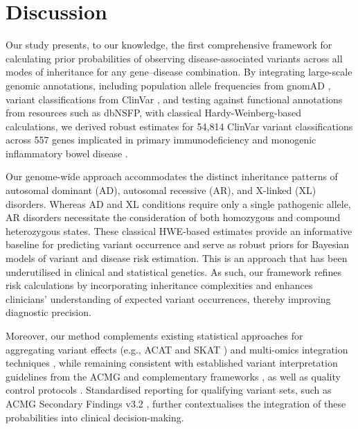 %
%
%

\section{Discussion}

Our study presents, to our knowledge, the first comprehensive framework for calculating prior probabilities of observing disease-associated variants across all modes of inheritance for any gene–disease combination. By integrating large-scale genomic annotations, including population allele frequencies from gnomAD \cite{karczewski2020mutational}, variant classifications from ClinVar \cite{landrum_clinvar_2018}, and testing against functional annotations from resources such as dbNSFP, with classical Hardy-Weinberg-based calculations, we derived robust estimates for 54,814 ClinVar variant classifications across 557 genes implicated in primary immunodeficiency and monogenic inflammatory bowel disease \cite{lawless_panelapprex_2025}. 

Our genome-wide approach accommodates the distinct inheritance patterns of autosomal dominant (AD), autosomal recessive (AR), and X-linked (XL) disorders. Whereas AD and XL conditions require only a single pathogenic allele, AR disorders necessitate the consideration of both homozygous and compound heterozygous states. These classical HWE-based estimates provide an informative baseline for predicting variant occurrence and serve as robust priors for Bayesian models of variant and disease risk estimation. This is an approach that has been underutilised in clinical and statistical genetics. As such, our framework refines risk calculations by incorporating inheritance complexities and enhances clinicians’ understanding of expected variant occurrences, thereby improving diagnostic precision.

Moreover, our method complements existing statistical approaches for aggregating variant effects (e.g., ACAT and SKAT \cite{liu2019acat,li2020dynamic,wu2011rare,lee2012optimal}) and multi-omics integration techniques \cite{kong2018nature,howe2021within}, while remaining consistent with established variant interpretation guidelines from the ACMG \cite{richards2015standards} and complementary frameworks \cite{tavtigian2020fitting,li2017intervar}, as well as quality control protocols \cite{pedersen2021effective,anderson2010data}. Standardised reporting for qualifying variant sets, such as ACMG Secondary Findings v3.2 \cite{miller2023acmg}, further contextualises the integration of these probabilities into clinical decision-making.

